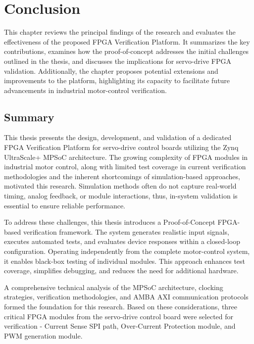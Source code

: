 \chapter{Conclusion}

This chapter reviews the principal findings of the research and evaluates the effectiveness of the proposed \acs{FPGA} Verification Platform. It summarizes the key contributions, examines how the proof-of-concept addresses the initial challenges outlined in the thesis, and discusses the implications for servo-drive \acs{FPGA} validation. Additionally, the chapter proposes potential extensions and improvements to the platform, highlighting its capacity to facilitate future advancements in industrial motor-control verification.

\section{Summary}

This thesis presents the design, development, and validation of a dedicated \acs{FPGA} Verification Platform for servo-drive control boards utilizing the Zynq UltraScale+ \acs{MPSoC} architecture. The growing complexity of \acs{FPGA} modules in industrial motor control, along with limited test coverage in current verification methodologies and the inherent shortcomings of simulation-based approaches, motivated this research. Simulation methods often do not capture real-world timing, analog feedback, or module interactions, thus, in-system validation is essential to ensure reliable performance.

To address these challenges, this thesis introduces a Proof-of-Concept \acs{FPGA}-based verification framework. The system generates realistic input signals, executes automated tests, and evaluates device responses within a closed-loop configuration. Operating independently from the complete motor-control system, it enables black-box testing of individual modules. This approach enhances test coverage, simplifies debugging, and reduces the need for additional hardware.

A comprehensive technical analysis of the \acs{MPSoC} architecture, clocking strategies, verification methodologies, and \acs{AMBA} \acs{AXI} communication protocols formed the foundation for this research. Based on these considerations, three critical \acs{FPGA} modules from the servo-drive control board were selected for verification - Current Sense \acs{SPI} path, Over-Current Protection module, and \acs{PWM} generation module.

